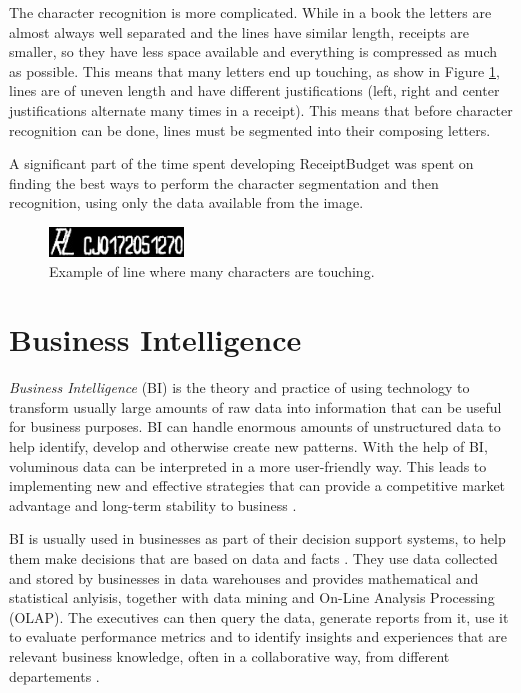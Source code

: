 The character recognition is more complicated. While in a book the letters are almost always well separated and the lines have similar length, receipts are smaller, so they have less space available and everything is compressed as much as possible. This means that many letters end up touching, as show in Figure \ref{fig:line}, lines are of uneven length and have different justifications (left, right and center justifications alternate many times in a receipt). This means that before character recognition can be done, lines must be segmented into their composing letters. 

A significant part of the time spent developing ReceiptBudget was spent on finding the best ways to perform the character segmentation and then recognition, using only the data available from the image. 

\begin{figure}[h!]
\begin{center}
\includegraphics[width=0.7\columnwidth]{img/linie_bon.jpg}
\caption{\label{fig:line}
Example of line where many characters are touching.}
\end{center}
\end{figure}

\section{Business Intelligence}
\textit{Business Intelligence} (BI) is the theory and practice of using technology to transform usually large amounts of raw data into information that can be useful for business purposes. BI can handle enormous amounts of unstructured data to help identify, develop and otherwise create new patterns. With the help of BI, voluminous data can be interpreted in a more user-friendly way. This leads to implementing new and effective strategies that can provide a competitive market advantage and long-term stability to business  \cite{rud2009business}.

BI is usually used in businesses as part of their decision support systems, to help them make decisions that are based on data and facts \cite{power2007brief}. They use data collected and stored by businesses in data warehouses and provides mathematical and statistical anlyisis, together with data mining and On-Line Analysis Processing (OLAP). The executives can then query the data, generate reports from it, use it  to evaluate performance metrics and to identify insights and experiences that are relevant business knowledge, often in a collaborative way, from different departements \cite{Ghazanfari20111579}. 

